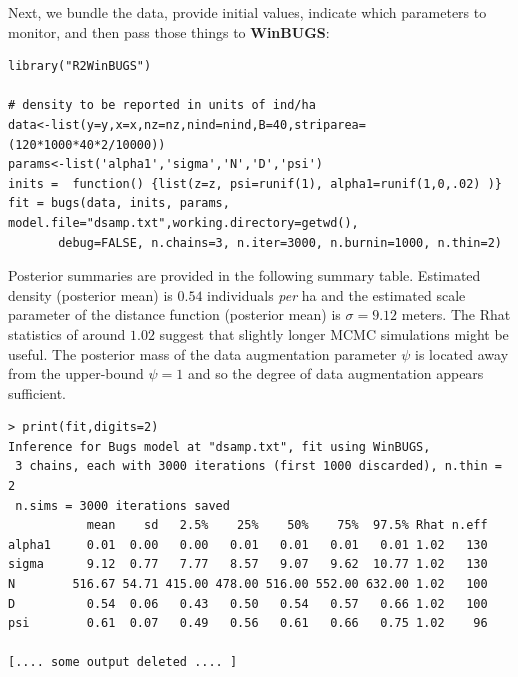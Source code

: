 Next, we bundle the data,
provide initial values, indicate which parameters to monitor, and then
pass those things to {\bf WinBUGS}:
{\small
\begin{verbatim}
library("R2WinBUGS")

# density to be reported in units of ind/ha
data<-list(y=y,x=x,nz=nz,nind=nind,B=40,striparea=(120*1000*40*2/10000))
params<-list('alpha1','sigma','N','D','psi')
inits =  function() {list(z=z, psi=runif(1), alpha1=runif(1,0,.02) )}
fit = bugs(data, inits, params, model.file="dsamp.txt",working.directory=getwd(),
       debug=FALSE, n.chains=3, n.iter=3000, n.burnin=1000, n.thin=2)
\end{verbatim}
}
Posterior summaries are provided in the following summary
table. Estimated density (posterior mean) is $0.54$ individuals {\it
  per} ha and the estimated scale parameter of the distance function
(posterior mean) is $\sigma=9.12$ meters.  The Rhat statistics of
around $1.02$ suggest that slightly longer MCMC simulations might be
useful. The posterior mass of the data augmentation parameter $\psi$
is located away from the upper-bound $\psi=1$ and so the degree of
data augmentation appears sufficient.
{\small
\begin{verbatim}
> print(fit,digits=2)
Inference for Bugs model at "dsamp.txt", fit using WinBUGS,
 3 chains, each with 3000 iterations (first 1000 discarded), n.thin = 2
 n.sims = 3000 iterations saved
           mean    sd   2.5%    25%    50%    75%  97.5% Rhat n.eff
alpha1     0.01  0.00   0.00   0.01   0.01   0.01   0.01 1.02   130
sigma      9.12  0.77   7.77   8.57   9.07   9.62  10.77 1.02   130
N        516.67 54.71 415.00 478.00 516.00 552.00 632.00 1.02   100
D          0.54  0.06   0.43   0.50   0.54   0.57   0.66 1.02   100
psi        0.61  0.07   0.49   0.56   0.61   0.66   0.75 1.02    96

[.... some output deleted .... ]

\end{verbatim}
}




